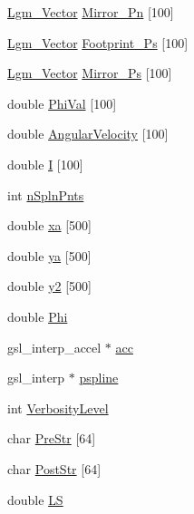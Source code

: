 \begin{CompactItemize}
\item 
\hyperlink{struct_lgm___vector}{Lgm\_\-Vector} \hyperlink{struct_lgm___lstar_info_cab1b2b38cdcb108925a62d5776ea71c}{Mirror\_\-Pn} \mbox{[}100\mbox{]}
\item 
\hyperlink{struct_lgm___vector}{Lgm\_\-Vector} \hyperlink{struct_lgm___lstar_info_ade743fcc24633af3a5485dc7a9d5147}{Footprint\_\-Ps} \mbox{[}100\mbox{]}
\item 
\hyperlink{struct_lgm___vector}{Lgm\_\-Vector} \hyperlink{struct_lgm___lstar_info_3b9e030b6e119c8e96b971ff682288c9}{Mirror\_\-Ps} \mbox{[}100\mbox{]}
\item 
double \hyperlink{struct_lgm___lstar_info_04ec246114a405539c0accd9be478347}{PhiVal} \mbox{[}100\mbox{]}
\item 
double \hyperlink{struct_lgm___lstar_info_d76bd4e5f331d6a1ddcaa1639fd68496}{AngularVelocity} \mbox{[}100\mbox{]}
\item 
double \hyperlink{struct_lgm___lstar_info_41ab61f1b0e2b2ebe5247fbbbdd57b0b}{I} \mbox{[}100\mbox{]}
\item 
int \hyperlink{struct_lgm___lstar_info_11528df252ee43e0e82ac6490020181f}{nSplnPnts}
\item 
double \hyperlink{struct_lgm___lstar_info_501f2c063215b27203462b91f615f570}{xa} \mbox{[}500\mbox{]}
\item 
double \hyperlink{struct_lgm___lstar_info_2186b66c32c372f89e9cd85d4e0e5bea}{ya} \mbox{[}500\mbox{]}
\item 
double \hyperlink{struct_lgm___lstar_info_4e6e2ef6cbd430bce10cbd07a1e6c045}{y2} \mbox{[}500\mbox{]}
\item 
double \hyperlink{struct_lgm___lstar_info_0701272ef4e36f8d410e1a99161361fe}{Phi}
\item 
gsl\_\-interp\_\-accel $\ast$ \hyperlink{struct_lgm___lstar_info_7c9a9e6523a7a6e67a5b349e772e3765}{acc}
\item 
gsl\_\-interp $\ast$ \hyperlink{struct_lgm___lstar_info_e44485025e16910b09a8c4e37b519bb1}{pspline}
\item 
int \hyperlink{struct_lgm___lstar_info_ef3011234df74566b679b46e01273bb7}{VerbosityLevel}
\item 
char \hyperlink{struct_lgm___lstar_info_4f91fd49adec5f649e536a8d0c61f15f}{PreStr} \mbox{[}64\mbox{]}
\item 
char \hyperlink{struct_lgm___lstar_info_450023a7fe05d37b7b67d03dc1efc7ba}{PostStr} \mbox{[}64\mbox{]}
\item 
double \hyperlink{struct_lgm___lstar_info_6ad8261bf3a41eb108787d3d924f5c45}{LS}

\end{CompactItemize}
